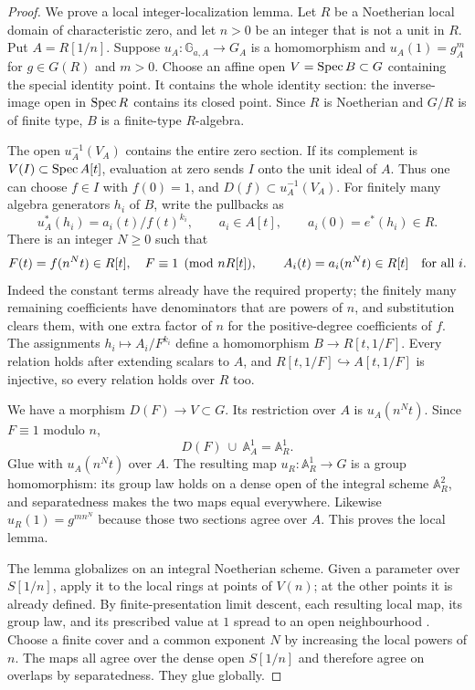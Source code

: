 \begin{proof}
We prove a local integer-localization lemma. Let $R$ be a
Noetherian local domain of characteristic zero, and let $n>0$
be an integer that is not a unit in $R$. Put $A=R[1/n]$.
Suppose $u_A:\mathbb G_{a,A}\to G_A$ is a homomorphism and
$u_A(1)=g_A^m$ for $g\in G(R)$ and $m>0$. Choose an affine open
$V=\operatorname{Spec} B\subset G$ containing the special identity point.
It contains the whole identity section: the inverse-image open
in $\operatorname{Spec} R$ contains its closed point. Since $R$ is Noetherian
and $G/R$ is of finite type, $B$ is a finite-type $R$-algebra.

The open $u_A^{-1}(V_A)$ contains the entire zero section.
If its complement is $V(I)\subset\operatorname{Spec} A[t]$, evaluation at
zero sends $I$ onto the unit ideal of $A$. Thus one can choose
$f\in I$ with $f(0)=1$, and $D(f)\subset u_A^{-1}(V_A)$.
For finitely
many algebra generators $h_i$ of $B$, write the pullbacks as
\[
             u_A^*(h_i)=a_i(t)/f(t)^{k_i},\qquad
             a_i\in A[t],\qquad a_i(0)=e^*(h_i)\in R.
\]
There is an integer $N\ge0$ such that
\[
 F(t)=f(n^Nt)\in R[t],\quad F\equiv1\pmod{nR[t]},
 \qquad A_i(t)=a_i(n^Nt)\in R[t]\quad\hbox{for all }i.
\]
Indeed the constant terms already have the required property;
the finitely many remaining coefficients have denominators that
are powers of $n$, and substitution clears them, with one extra
factor of $n$ for the positive-degree coefficients of $f$.
The assignments
$h_i\mapsto A_i/F^{k_i}$ define a homomorphism
$B\to R[t,1/F]$. Every relation holds after extending scalars
to $A$, and $R[t,1/F]\hookrightarrow A[t,1/F]$ is injective,
so every relation holds over $R$ too.

We have a morphism $D(F)\to V\subset G$. Its restriction
over $A$ is $u_A(n^Nt)$. Since $F\equiv1$ modulo $n$,
\[
                      D(F)\ \cup\ \mathbb A^1_A
                         =\mathbb A^1_R.
\]
Glue with $u_A(n^Nt)$ over $A$. The resulting map
$u_R:\mathbb A^1_R\to G$ is a group homomorphism: its group
law holds on a dense open of the integral scheme
$\mathbb A^2_R$, and separatedness makes the two maps equal
everywhere. Likewise $u_R(1)=g^{mn^N}$ because those two
sections agree over $A$. This proves the local lemma.

The lemma globalizes on an integral Noetherian scheme. Given a
parameter over $S[1/n]$, apply it to the local rings at points
of $V(n)$; at the other points it is already defined. By
finite-presentation limit descent, each resulting local map,
its group law, and its prescribed value at $1$ spread to an open
neighbourhood \citep[Lemma 32.10.1(2)--(3)]{DN_StacksLimits}.
Choose a finite cover and a common exponent $N$ by increasing
the local powers of $n$. The maps all agree over the dense
open $S[1/n]$ and therefore agree on overlaps by separatedness.
They glue globally.


\end{proof}
